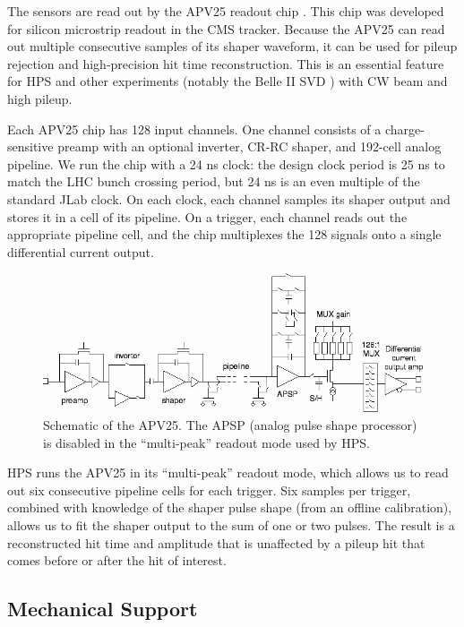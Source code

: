 The sensors are read out by the APV25 readout chip \cite{french_design_2001}.
This chip was developed for silicon microstrip readout in the CMS tracker.
Because the APV25 can read out multiple consecutive samples of its shaper waveform, it can be used for pileup rejection and high-precision hit time reconstruction.
This is an essential feature for HPS and other experiments (notably the Belle II SVD \cite{liu_belle_2012}) with CW beam and high pileup.

Each APV25 chip has 128 input channels.
One channel consists of a charge-sensitive preamp with an optional inverter, CR-RC shaper, and 192-cell analog pipeline.
We run the chip with a 24 ns clock: the design clock period is 25 ns to match the LHC bunch crossing period, but 24 ns is an even multiple of the standard JLab clock.
On each clock, each channel samples its shaper output and stores it in a cell of its pipeline.
On a trigger, each channel reads out the appropriate pipeline cell, and the chip multiplexes the 128 signals onto a single differential current output.

\begin{figure}[htp]
    \includegraphics[width=\textwidth]{detector/figs/apv25}
    \caption{Schematic of the APV25. The APSP (analog pulse shape processor) is disabled in the ``multi-peak'' readout mode used by HPS.}
    \label{fig:apv25}
\end{figure}

HPS runs the APV25 in its ``multi-peak'' readout mode, which allows us to read out six consecutive pipeline cells for each trigger.
Six samples per trigger, combined with knowledge of the shaper pulse shape (from an offline calibration), allows us to fit the shaper output to the sum of one or two pulses.
The result is a reconstructed hit time and amplitude that is unaffected by a pileup hit that comes before or after the hit of interest.

\subsection{Mechanical Support}
\label{sec:svt_mechanical}

